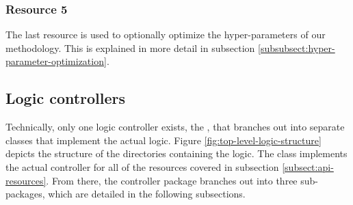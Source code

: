 \documentclass[12pt,a4paper]{report}
\begin{document}
\subsubsection{Resource 5} The last resource is used to optionally optimize the
hyper\hyp parameters of our methodology. This is explained in more detail in
subsection \ref{subsubsect:hyper-parameter-optimization}.


\subsection{Logic controllers}

Technically, only one logic controller exists, the ,
that branches out into separate classes that implement the actual logic. Figure
\ref{fig:top-level-logic-structure} depicts the structure of the directories
containing the logic. The  class implements the actual
controller for all of the  resources covered in subsection
\ref{subsect:api-resources}. From there, the  controller package
branches out into three sub-packages, which are detailed in the following
subsections.
\end{document}
